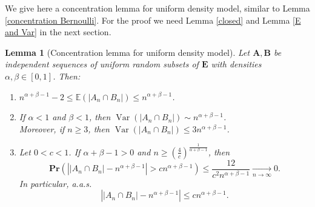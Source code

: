 \documentclass{article}
\DeclareMathOperator{\Var}{Var}
\newcommand{\bs}{\boldsymbol}
\newcommand{\tendvers}{\xrightarrow[n\to\infty]{}}
\def\Pr{\mathbf{Pr}}
\newtheorem{lem}[thm]{Lemma}
\theoremstyle{remark}
\begin{document}
We give here a concentration lemma for uniform density model, similar to Lemma \ref{concentration Bernoulli}. For the proof we need Lemma \ref{closed} and Lemma \ref{E and Var} in the next section.

\begin{lem}[Concentration lemma for uniform density model]\label{concentration uniform} Let $\bs A,\bs B$ be independent sequences of uniform random subsets of $\bs E$ with densities $\alpha,\beta\in [0,1]$. Then:
\begin{enumerate}[$(i)$]
    \item $n^{\alpha+\beta-1}-2\leq \mathbb{E}(|A_n\cap B_n|) \leq n^{\alpha+\beta-1}$.
    \item If $\alpha<1$ and $\beta <1$, then $\Var(|A_n\cap B_n|) \sim n^{\alpha+\beta-1}$.\\[6pt]
   Moreover, if $n\geq 3$, then $\Var(|A_n\cap B_n|) \leq 3n^{\alpha+\beta-1}$.
    \item Let $0<c<1$. If $\alpha+\beta - 1 > 0$ and $n\geq \left(\frac{4}{c}\right)^{\frac{1}{\alpha+\beta-1}}$, then
    \[\Pr\left(\left||A_n\cap B_n|-n^{\alpha+\beta-1}\right|> cn^{\alpha+\beta-1}\right)\leq \frac{12}{c^2n^{\alpha+\beta-1}}\tendvers 0.\] 
    In particular, a.a.s.
    \[\left||A_n\cap B_n|-n^{\alpha+\beta-1}\right| \leq cn^{\alpha+\beta-1}.\]
\end{enumerate}
\end{lem}
\end{document}
